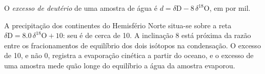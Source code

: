 \begin{definition}\label{def:b3:stable-isotopes:d-excess}
O \emph{excesso de deutério} de uma amostra de água é $d =
\delta\mathrm D - 8\,\delta^{18}\mathrm O$, em por mil.
\end{definition}

A precipitação dos continentes do Hemisfério Norte situa-se sobre a reta
$\delta\mathrm D = 8.0\,\delta^{18}\mathrm O + 10$: seu  é de cerca de
\qty{10}{\permil}. A inclinação 8 está próxima da razão entre os fracionamentos de equilíbrio
dos dois isótopos na condensação. O excesso de 10, e não 0,
registra a evaporação cinética a partir do oceano, e o excesso de uma amostra
mede quão longe do equilíbrio a água da amostra evaporou.

